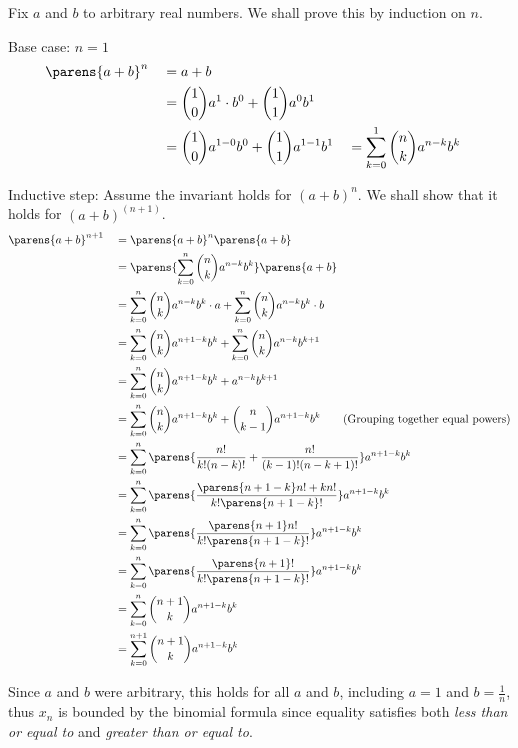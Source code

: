 \begin{problem}
\begin{enumroman}
      \begin{answer}
        Fix $a$ and $b$ to arbitrary real numbers.
        We shall prove this by induction on $n$.
        \begin{enumalph}
          \item Base case: $n = 1$
            \begin{alignat*}{5}
              & \parens{a + b}^n &&= a + b \\
              & &&= \binom{1}{0} a^{1} \cdot b^0 + \binom{1}{1} a^0 b^1 \\
              & &&= \binom{1}{0} a^{1-0} b^0 + \binom{1}{1} a^{1-1} b^1 &&= \sum_{k=0}^1{\binom{n}{k} a^{n-k} b^k}
            \end{alignat*}
          \item Inductive step: Assume the invariant holds
            for ${(a+b)}^n$.
            We shall show that it holds for ${(a+b)}^{(n+1)}$.
            \begin{alignat*}{5}
              & \parens{a + b}^{n+1} &&= \parens{a + b}^n \parens{a + b} \\
              & &&= \parens{\sum_{k=0}^n{\binom{n}{k} a^{n-k} b^k}} \parens{a + b} \\
              & &&= \sum_{k=0}^n{\binom{n}{k} a^{n-k} b^k} \cdot a + \sum_{k=0}^n{\binom{n}{k} a^{n-k} b^k} \cdot b \\
              & &&= \sum_{k=0}^n{\binom{n}{k} a^{n+1-k} b^k} + \sum_{k=0}^n{\binom{n}{k} a^{n-k} b^{k+1}} \\
              & &&= \sum_{k=0}^n{\binom{n}{k} a^{n+1-k} b^k + a^{n-k} b^{k+1}} \\
              & &&= \sum_{k=0}^n{\binom{n}{k} a^{n+1-k} b^k + \binom{n}{k-1} a^{n+1-k} b^k} \qquad \text{(Grouping together equal powers)} \\
              & &&= \sum_{k=0}^n{\parens{\frac{n!}{k! (n-k)!} + \frac{n!}{(k-1)! (n-k+1)!}}} a^{n+1-k} b^k \\
              & &&= \sum_{k=0}^n{\parens{\frac{\parens{n+1-k}n! + kn!}{k!\parens{n+1-k}!}}} a^{n+1-k} b^k \\
              & &&= \sum_{k=0}^n{\parens{\frac{\parens{n+1}n!}{k!\parens{n+1-k}!}}} a^{n+1-k} b^k \\
              & &&= \sum_{k=0}^n{\parens{\frac{\parens{n+1}!}{k!\parens{n+1-k}!}}} a^{n+1-k} b^k \\
              & &&= \sum_{k=0}^n{\binom{n+1}{k} a^{n+1-k} b^k} \\
              & &&= \sum_{k=0}^{n+1}{\binom{n+1}{k} a^{n+1-k} b^k}
            \end{alignat*}
        \end{enumalph}
        Since $a$ and $b$ were arbitrary, this holds for all $a$ and $b$,
        including $a = 1$ and $b = \frac{1}{n}$, thus
        $x_n$ is bounded by the binomial formula since equality
        satisfies both \emph{less than or equal to} and \emph{greater than or equal to}.
      \end{answer}


\end{enumroman}
\end{problem}
